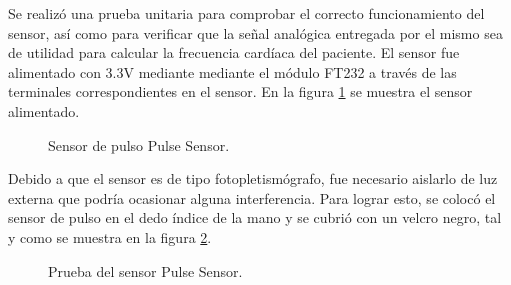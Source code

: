 Se realizó una prueba unitaria para comprobar el correcto funcionamiento del sensor, así como para verificar que la señal analógica entregada por el mismo sea de utilidad para calcular la frecuencia cardíaca del paciente. El sensor fue alimentado con 3.3V mediante mediante el módulo FT232 a través de las terminales correspondientes en el sensor. En la figura \ref{fig:PulseSensor2} se muestra el sensor alimentado.\\

\begin{figure}[htbp!]
	\centering
	\caption{Sensor de pulso Pulse Sensor.}
	\label{fig:PulseSensor2}
\end{figure}

Debido a que el sensor es de tipo fotopletismógrafo, fue necesario aislarlo de luz externa que podría ocasionar alguna interferencia. Para lograr esto, se colocó el sensor de pulso en el dedo índice de la mano y se cubrió con un velcro negro, tal y como se muestra en la figura \ref{fig:PulseSensor1}.\\

\begin{figure}[htbp!]
	\centering
	\caption{Prueba del sensor Pulse Sensor.}
	\label{fig:PulseSensor1}
\end{figure}

